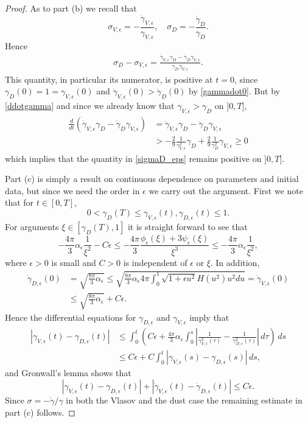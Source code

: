 \documentclass[11pt]{article}
\begin{document}
\begin{proof}
  As to part (b) we recall that
  \[
  \sigma_{V,\epsilon} = -\frac{\dot\gamma_{V,\epsilon}}{\gamma_{V,\epsilon}},\quad
  \sigma_D = -\frac{\dot\gamma_D}{\gamma_D}.
  \]
  Hence
  \begin{align}\label{sigmaD_eps}
  \sigma_D - \sigma_{V,\epsilon} =
  \frac{\dot\gamma_{V,\epsilon}\gamma_D - \dot\gamma_D \gamma_{V,\epsilon}}
       {\gamma_D\gamma_{V,\epsilon}}.
  \end{align}
  This quantity, in particular its numerator, is positive
  at $t=0$, since $\gamma_D(0)=1=\gamma_{V,\epsilon}(0)$ and
  $\dot\gamma_{V,\epsilon}(0)>\dot\gamma_D(0)$ by \eqref{gammadot0}.
  But by \eqref{ddotgamma} and since we already know that
  $\gamma_{V,\epsilon}>\gamma_D$ on $]0,T]$,
  \begin{align*}
    \frac{d}{dt}
    \left(\dot\gamma_{V,\epsilon}\gamma_D - \dot\gamma_D \gamma_{V,\epsilon}\right)
    & =
    \ddot\gamma_{V,\epsilon}\gamma_D - \ddot\gamma_D \gamma_{V,\epsilon}\\
    & >
    -\frac{2}{9} \frac{1}{\gamma^2_{V,\epsilon}} \gamma_D
    + \frac{2}{9} \frac{1}{\gamma^2_D} \gamma_{V,\epsilon}
    \geq 0
  \end{align*}
  which implies that the quantity in \eqref{sigmaD_eps} remains positive
  on $]0,T]$.

  Part (c) is simply a result on continuous dependence on parameters
  and initial data, but since we need the order in $\epsilon$ we carry
  out the argument. First we note that for $t\in [0,T]$,
  \[
  0< \gamma_D(T)\leq \gamma_{V,\epsilon}(t), \gamma_{D,\epsilon}(t)\leq 1 .
  \]
  For arguments $\xi \in [\gamma_D(T),1]$ it is straight forward to
  see that
  \[
  -\frac{4\pi}{3}\alpha_\epsilon \frac{1}{\xi^2} - C\epsilon
  \leq -\frac{4\pi}{3}\frac{\phi_{\epsilon}(\xi) + 3 \psi_{\epsilon}(\xi)}{\xi^3}
  \leq -\frac{4\pi}{3}\alpha_\epsilon \frac{1}{\xi^2},
  \]
  where $\epsilon>0$ is small and $C>0$ is independent of $\epsilon$ or $\xi$.
  In addition,
  \begin{align*}
    \dot\gamma_{D,\epsilon}(0)
    &=
    \sqrt{\frac{8\pi}{3}\alpha_\epsilon}
    \leq
    \sqrt{\frac{8\pi}{3}\alpha_\epsilon 4\pi\int_0^1\sqrt{1+\epsilon u^2} H(u^2)
      u^2 du} =  \dot\gamma_{V,\epsilon}(0)\\
    &\leq
    \sqrt{\frac{8\pi}{3}\alpha_\epsilon} + C \epsilon.
  \end{align*}
  Hence the differential equations for $\gamma_{D,\epsilon}$
  and $\gamma_{V,\epsilon}$ imply that
  \begin{align*}
    |\gamma_{V,\epsilon}(t) -\gamma_{D,\epsilon}(t)|
    &\leq
    \int_0^t\left(C \epsilon + \frac{4\pi}{3}\alpha_\epsilon
    \int_0^s \left|\frac{1}{\gamma^2_{V,\epsilon}(\tau)}-
    \frac{1}{\gamma^2_{D,\epsilon}(\tau)}\right|\,d\tau\right)\,ds\\
    &\leq
    C \epsilon + C \int_0^t |\gamma_{V,\epsilon}(s) -\gamma_{D,\epsilon}(s)|\,ds,
  \end{align*}
  and Gronwall's lemma shows that
  \[
  |\gamma_{V,\epsilon}(t) -\gamma_{D,\epsilon}(t)|
  + |\dot \gamma_{V,\epsilon}(t) -\dot\gamma_{D,\epsilon}(t)|\leq C \epsilon.
  \]
  Since $\sigma= - \dot\gamma/\gamma$ in both the Vlasov and the dust case
  the remaining estimate in part (c) follows.
\end{proof}
\end{document}
